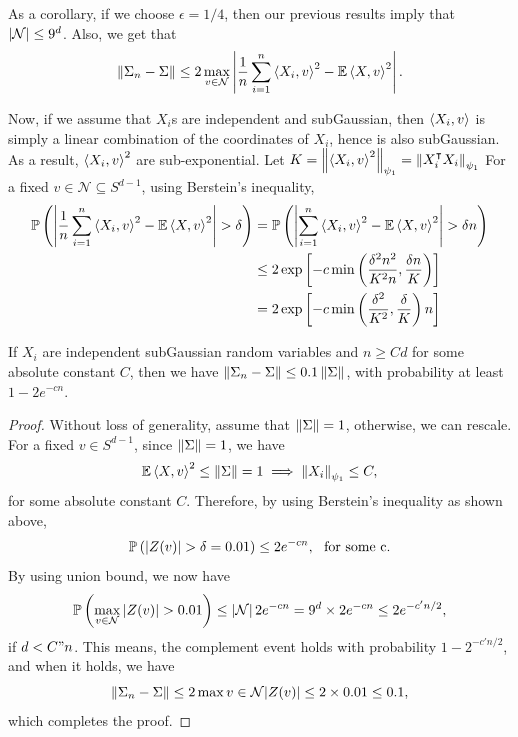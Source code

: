 \documentclass[12pt]{article}
\begin{document}
As a corollary, if we choose $\epsilon = 1/4$, then our previous results imply that $\left\lvert \mathcal{N} \right\rvert \leq 9^d$. Also, we get that
\begin{equation*}
    \left\Vert \Sigma_n - \Sigma \right\Vert \leq 2 \max_{v \in \mathcal{N}} \left\vert \dfrac{1}{n}\sum_{i=1}^n \left\langle X_i, v \right\rangle^2 - \mathbb{E}\left\langle X, v \right\rangle^2 \right\vert.
\end{equation*}

Now, if we assume that $X_i$s are independent and subGaussian, then $\left\langle X_i, v \right\rangle$ is simply a linear combination of the coordinates of $X_i$, hence is also subGaussian. As a result, $\left\langle X_i, v \right\rangle^2$ are sub-exponential. Let $K = \left\Vert \left\langle X_i, v \right\rangle^2 \right\Vert_{\psi_1} = \left\Vert X_i^{\intercal} X_i \right\Vert_{\psi_1}$ For a fixed $v \in \mathcal{N} \subseteq S^{d-1}$, using Berstein's inequality,
\begin{align*}
    \mathbb{P}\left( \left\vert \dfrac{1}{n}\sum_{i=1}^n \left\langle X_i, v \right\rangle^2 - \mathbb{E}\left\langle X, v \right\rangle^2 \right\vert > \delta \right)
    & = \mathbb{P}\left( \left\vert \sum_{i=1}^n \left\langle X_i, v \right\rangle^2 - \mathbb{E}\left\langle X, v \right\rangle^2 \right\vert > \delta n \right)\\
    & \leq 2 \exp\left[ - c \min\left( \dfrac{\delta^2 n^2}{K^2 n}, \dfrac{\delta n}{K} \right) \right]\\
    & = 2 \exp\left[ - c\min\left(  \dfrac{\delta^2}{K^2}, \dfrac{\delta}{K} \right)n \right]
\end{align*}

\begin{theorembox}
    If $X_i$ are independent subGaussian random variables and $n \geq Cd$ for some absolute constant $C$, then we have $\left\Vert \Sigma_n - \Sigma \right\Vert \leq 0.1 \left\Vert \Sigma \right\Vert$, with probability at least $1 - 2e^{-cn}$.
\end{theorembox}
\begin{proof}
    Without loss of generality, assume that $\left\Vert \Sigma \right\Vert = 1$, otherwise, we can rescale. For a fixed $v \in S^{d-1}$, since $\left\Vert \Sigma \right\Vert = 1$, we have
    \begin{equation*}
        \mathbb{E}\left\langle X, v \right\rangle^2 \leq \left\Vert \Sigma \right\Vert = 1 \implies \left\Vert X_i \right\Vert_{\psi_1} \leq C,
    \end{equation*}
    \noindent for some absolute constant $C$. Therefore, by using Berstein's inequality as shown above,
    \begin{equation*}
        \mathbb{P}\left( \left\vert Z(v) \right\vert > \delta = 0.01 \right)
        \leq 2 e^{-cn}, \ \text{ for some c}.
    \end{equation*}
    \noindent By using union bound, we now have
    \begin{equation*}
        \mathbb{P}\left( \max_{v \in \mathcal{N}} \left\vert Z(v) \right\vert > 0.01 \right) \leq \left\lvert \mathcal{N} \right\rvert 2e^{-cn} = 9^d \times 2 e^{-cn} \leq 2e^{-c'n/2},
    \end{equation*}
    \noindent if $d < C"n$. This means, the complement event holds with probability $1 - 2^{-c'n/2}$, and when it holds, we have
    \begin{equation*}
        \left\Vert \Sigma_n - \Sigma \right\Vert \leq 2 \max{v \in \mathcal{N}} \vert Z(v)\vert \leq 2 \times 0.01 \leq 0.1,
    \end{equation*}
    \noindent which completes the proof.
\end{proof}
\end{document}
